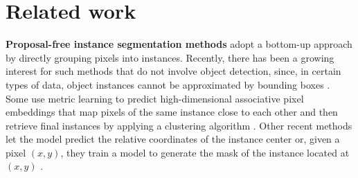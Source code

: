 
\section{Related work} \label{sec:related_work}

\textbf{Proposal-free instance segmentation methods} adopt a bottom-up approach by directly grouping pixels into instances. Recently, there has been a growing interest for such  methods that do not involve object detection, since, in certain types of data, object instances cannot be approximated by bounding boxes \cite{kirillov2017instancecut,bai2017deep}. 
Some use metric learning to predict high-dimensional associative pixel embeddings that map pixels of the same instance close to each other \cite{lee2019learning,fathi2017semantic,newell2017associative,de2017semantic}
and then retrieve final instances by applying a clustering algorithm \cite{kong2018recurrentPix}.
Other recent methods let the model predict the relative coordinates of the instance center \cite{neven2019instance,cheng2019panopticdeeplab} or, given a pixel $(x,y)$, they train a model to generate the mask of the instance located at $(x,y)$ \cite{sofiiuk2019adaptis}. 

